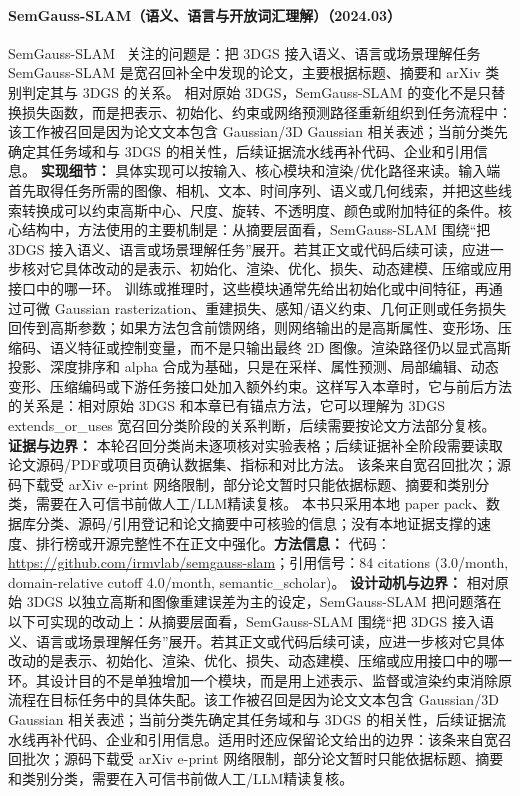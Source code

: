 \paragraph{SemGauss-SLAM（语义、语言与开放词汇理解）（2024.03）}
SemGauss-SLAM~\cite{2403_07494} 关注的问题是：把 3DGS 接入语义、语言或场景理解任务 SemGauss-SLAM 是宽召回补全中发现的论文，主要根据标题、摘要和 arXiv 类别判定其与 3DGS 的关系。
相对原始 3DGS，SemGauss-SLAM 的变化不是只替换损失函数，而是把表示、初始化、约束或网络预测路径重新组织到任务流程中：该工作被召回是因为论文文本包含 Gaussian/3D Gaussian 相关表述；当前分类先确定其任务域和与 3DGS 的相关性，后续证据流水线再补代码、企业和引用信息。
\textbf{实现细节：} 具体实现可以按输入、核心模块和渲染/优化路径来读。输入端首先取得任务所需的图像、相机、文本、时间序列、语义或几何线索，并把这些线索转换成可以约束高斯中心、尺度、旋转、不透明度、颜色或附加特征的条件。核心结构中，方法使用的主要机制是：从摘要层面看，SemGauss-SLAM 围绕“把 3DGS 接入语义、语言或场景理解任务”展开。若其正文或代码后续可读，应进一步核对它具体改动的是表示、初始化、渲染、优化、损失、动态建模、压缩或应用接口中的哪一环。 训练或推理时，这些模块通常先给出初始化或中间特征，再通过可微 Gaussian rasterization、重建损失、感知/语义约束、几何正则或任务损失回传到高斯参数；如果方法包含前馈网络，则网络输出的是高斯属性、变形场、压缩码、语义特征或控制变量，而不是只输出最终 2D 图像。渲染路径仍以显式高斯投影、深度排序和 alpha 合成为基础，只是在采样、属性预测、局部编辑、动态变形、压缩编码或下游任务接口处加入额外约束。这样写入本章时，它与前后方法的关系是：相对原始 3DGS 和本章已有锚点方法，它可以理解为 3DGS extends\_or\_uses 宽召回分类阶段的关系判断，后续需要按论文方法部分复核。
\textbf{证据与边界：} 本轮召回分类尚未逐项核对实验表格；后续证据补全阶段需要读取论文源码/PDF或项目页确认数据集、指标和对比方法。 该条来自宽召回批次；源码下载受 arXiv e-print 网络限制，部分论文暂时只能依据标题、摘要和类别分类，需要在入可信书前做人工/LLM精读复核。 本书只采用本地 paper pack、数据库分类、源码/引用登记和论文摘要中可核验的信息；没有本地证据支撑的速度、排行榜或开源完整性不在正文中强化。\textbf{方法信息：} 代码：\url{https://github.com/irmvlab/semgauss-slam}；引用信号：84 citations (3.0/month, domain-relative cutoff 4.0/month, semantic\_scholar)。
\textbf{设计动机与边界：} 相对原始 3DGS 以独立高斯和图像重建误差为主的设定，SemGauss-SLAM 把问题落在以下可实现的改动上：从摘要层面看，SemGauss-SLAM 围绕“把 3DGS 接入语义、语言或场景理解任务”展开。若其正文或代码后续可读，应进一步核对它具体改动的是表示、初始化、渲染、优化、损失、动态建模、压缩或应用接口中的哪一环。其设计目的不是单独增加一个模块，而是用上述表示、监督或渲染约束消除原流程在目标任务中的具体失配。该工作被召回是因为论文文本包含 Gaussian/3D Gaussian 相关表述；当前分类先确定其任务域和与 3DGS 的相关性，后续证据流水线再补代码、企业和引用信息。适用时还应保留论文给出的边界：该条来自宽召回批次；源码下载受 arXiv e-print 网络限制，部分论文暂时只能依据标题、摘要和类别分类，需要在入可信书前做人工/LLM精读复核。
